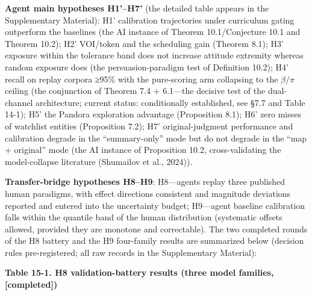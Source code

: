 \documentclass[
  11pt]{article}
\begin{document}
\textbf{Agent main hypotheses H1'--H7'} (the detailed table appears in
the Supplementary Material): H1' calibration trajectories under
curriculum gating outperform the baselines (the AI instance of Theorem
10.1/Conjecture 10.1 and Theorem 10.2); H2' VOI/token and the scheduling
gain (Theorem 8.1); H3' exposure within the tolerance band does not
increase attitude extremity whereas random exposure does (the
persuasion-paradigm test of Definition 10.2); H4' recall on replay
corpora ≥95\% with the pure-scoring arm collapsing to the \(\beta/\pi\)
ceiling (the conjunction of Theorem 7.4 + 6.1---the decisive test of the
dual-channel architecture; current status: conditionally established,
see §7.7 and Table 14-1); H5' the Pandora exploration advantage
(Proposition 8.1); H6' zero misses of watchlist entities (Proposition
7.2); H7' original-judgment performance and calibration degrade in the
``summary-only'' mode but do not degrade in the ``map + original'' mode
(the AI instance of Proposition 10.2, cross-validating the
model-collapse literature (Shumailov et al., 2024)).

\textbf{Transfer-bridge hypotheses H8--H9}: H8---agents replay three
published human paradigms, with effect directions consistent and
magnitude deviations reported and entered into the uncertainty budget;
H9---agent baseline calibration falls within the quantile band of the
human distribution (systematic offsets allowed, provided they are
monotone and correctable). The two completed rounds of the H8 battery
and the H9 four-family results are summarized below (decision rules
pre-registered; all raw records in the Supplementary Material):

\textbf{Table 15-1. H8 validation-battery results (three model families,
{[}completed{]})}
\end{document}
